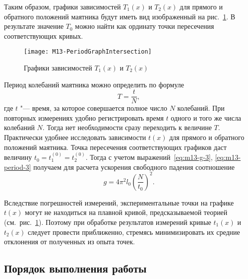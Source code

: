 \documentclass[a4paper, 12pt]{extarticle}
\begin{document}
Таким образом, графики зависимостей $T_1(x)$ и $T_2(x)$ для прямого и обратного положений маятника будут иметь вид изображенный на рис.~\ref{fig:m13-plot-2}. В результате значение $T_0$ можно найти как ординату точки пересечения соответствующих кривых. %

\begin{figure}[h]
\begin{center}
\texttt{[image: M13-PeriodGraphIntersection]}
\end{center}
\caption{Графики зависимостей $T_1(x)$ и $T_2(x)$ \label{fig:m13-plot-2}}
\end{figure}

Период колебаний маятника можно определить по формуле
\begin{equation}
\label{eq:m13-period-3}
T = \frac{t}{N},
\end{equation}
где $t$ "--- время, за которое совершается полное число $N$ колебаний. 
При повторных измерениях удобно регистрировать время $t$ одного и того же числа колебаний $N$. Тогда нет необходимости сразу переходить к величине $T$.  Практически удобнее исследовать зависимости $t(x)$ для прямого и обратного положений маятника. Точка пересечения соответствующих графиков даст величину $ t_0 = t_1^{(0)} = t_2^{(0)}$. Тогда с учетом выражений~\eqref{eq:m13-g-3}, \eqref{eq:m13-period-3} получаем для расчета ускорения свободного падения соотношение %
\begin{equation}
\label{eq:m13-g-4}
g = 4 \pi^2 l_0 \left( \frac{N}{t_0}\right) ^2.
\end{equation}

Вследствие погрешностей измерений, экспериментальные точки на графике $t(x)$ могут не находиться на плавной кривой, предсказываемой теорией (см.~рис.~\ref{fig:m13-plot-2}). Поэтому при обработке результатов измерений кривые $t_1(x)$ и $t_2(x)$ следует провести приближенно, стремясь минимизировать их средние отклонения от полученных из опыта точек. %

\subsection{Порядок выполнения работы}
\end{document}
